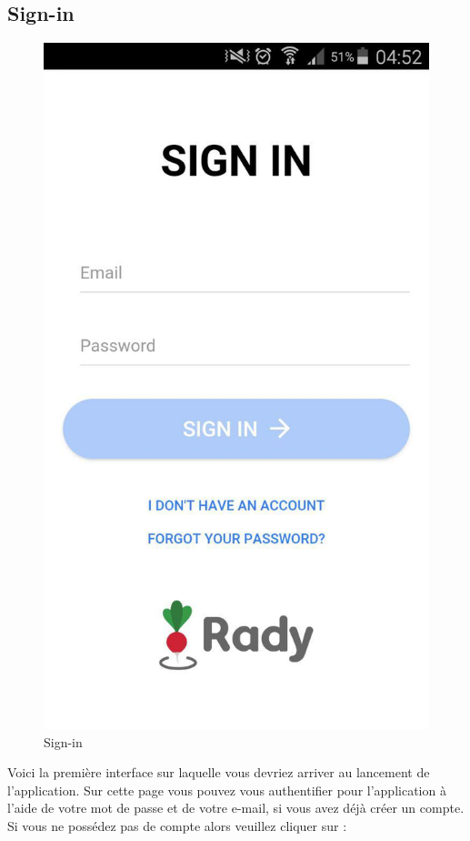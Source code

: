 \documentclass[french]{article}
\begin{document}
	\subsection{Sign-in}
	\begin{figure}[H]
		\centering
		\includegraphics[scale=0.4]{../screenshot/screenshot-sign-in}
		\caption{Sign-in}
		\label{Sign-in}
	\end{figure} 
	
	Voici la première interface sur laquelle vous devriez arriver au lancement de l'application. Sur cette page vous pouvez vous authentifier pour l'application à l'aide de votre mot de passe et de votre e-mail, si vous avez déjà créer un compte. Si vous ne possédez pas de compte alors veuillez cliquer sur :
	\bigskip
	
\end{document}
